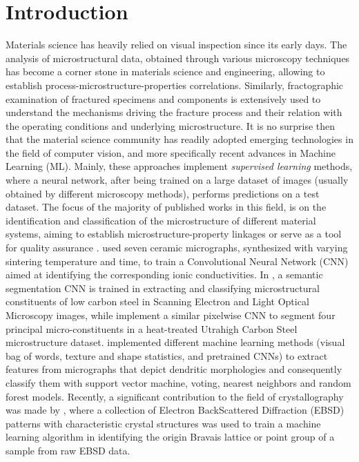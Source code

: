 \documentclass[authoryear,preprint,review,12pt, singleside]{elsarticle}
\begin{document}
\section{Introduction}

Materials science has heavily relied on visual inspection since its early days. The analysis of microstructural data, obtained through various microscopy techniques has become a corner stone in materials science and engineering, allowing to establish process-microstructure-properties correlations. Similarly, fractographic examination of fractured specimens and components is extensively used to understand the mechanisms driving the fracture process and their relation with the operating conditions and underlying microstructure.  It is no surprise then that the material science community has readily adopted emerging technologies in the field of computer vision, and more specifically recent advances in Machine Learning (ML).  Mainly, these approaches implement \textit{supervised learning} methods, where a neural network, after being trained on a large dataset of images (usually obtained by different microscopy methods), performs predictions on a test dataset. The focus of the majority of published works in this field,  is on the identification and classification of the microstructure of different material systems, aiming to establish microstructure-property linkages or serve as a tool for quality assurance \citep{decost2017AM}. \citet{micro1} used seven ceramic micrographs, synthesized with varying sintering temperature and time, to train a Convolutional Neural Network (CNN) aimed at identifying the corresponding ionic conductivities. In \citet{micro2}, a semantic segmentation CNN is trained in extracting and classifying microstructural constituents of low carbon steel in Scanning Electron and Light Optical Microscopy images, while \citet{micro3} implement a similar pixelwise CNN to segment four principal micro-constituents in a heat-treated Utrahigh Carbon Steel microstructure dataset. \citet{micro4} implemented different machine learning methods (visual bag of words, texture and shape statistics, and pretrained CNNs) to extract features from micrographs that depict dendritic morphologies and consequently classify them with support vector machine, voting, nearest neighbors and random forest models. 
Recently, a significant contribution to the field of crystallography was made by \citet{crystal1}, where a collection of Electron BackScattered Diffraction (EBSD) patterns with characteristic crystal structures was used to train a machine learning algorithm in identifying the origin Bravais lattice or point group of a sample from raw EBSD data. 
\end{document}
